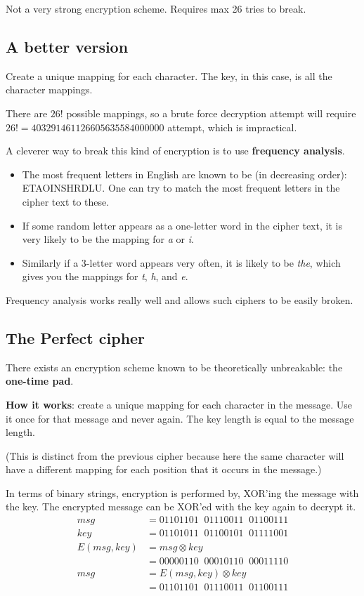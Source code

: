 \documentclass[twoside]{article}
\begin{document}
Not a very strong encryption scheme. Requires max 26 tries to break.

\subsection{A better version}
Create a unique mapping for each character. The key, in this case, is all the character mappings.

There are $26!$ possible mappings, so a brute force decryption attempt will require $26! = 403291461126605635584000000$ attempt, which is impractical.

A cleverer way to break this kind of encryption is to use \textbf{frequency analysis}.
\begin{itemize}
    \item The most frequent letters in English are known to be (in decreasing order):  ETAOINSHRDLU. One can try to match the most frequent letters in the cipher text to these.
    \item If some random letter appears as a one-letter word in the cipher text, it is very likely to be the mapping for \textit{a} or \textit{i}.
    \item Similarly if a 3-letter word appears very often, it is likely to be \textit{the}, which gives you the mappings for \textit{t}, \textit{h}, and \textit{e}.
\end{itemize}

Frequency analysis works really well and allows such ciphers to be easily broken.

\subsection{The Perfect cipher}
There exists an encryption scheme known to be theoretically unbreakable: the \textbf{one-time pad}.

\textbf {How it works}: create a unique mapping for each character in the message. Use it once for that message and never again. The key length is equal to the message length.

(This is distinct from the previous cipher because here the same character will have a different mapping for each position that it occurs in the message.)

In terms of binary strings, encryption is performed by, XOR'ing the message with the key. The encrypted message can be XOR'ed with the key again to decrypt it.
\begin{align}
    msg &= 01101101\;\;01110011\;\;01100111\\
    key &= 01101011\;\;01100101\;\;01111001\\
    E(msg, key) &= msg \otimes key\\
    &= 00000110\;\;00010110\;\;00011110\\
    msg &= E(msg, key) \otimes key\\
    &= 01101101\;\;01110011\;\;01100111
\end{align}
\end{document}
